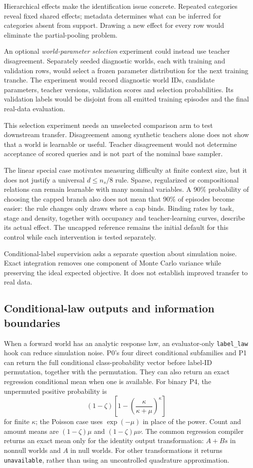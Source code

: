 \documentclass[11pt]{article}
\begin{document}
Hierarchical effects make the identification issue concrete. Repeated categories reveal fixed shared effects; metadata determines what can be inferred for categories absent from support. Drawing a new effect for every row would eliminate the partial-pooling problem.

An optional \emph{world-parameter selection} experiment could instead use teacher disagreement. Separately seeded diagnostic worlds, each with training and validation rows, would select a frozen parameter distribution for the next training tranche. The experiment would record diagnostic world IDs, candidate parameters, teacher versions, validation scores and selection probabilities. Its validation labels would be disjoint from all emitted training episodes and the final real-data evaluation.

This selection experiment needs an unselected comparison arm to test downstream transfer. Disagreement among synthetic teachers alone does not show that a world is learnable or useful. Teacher disagreement would not determine acceptance of scored queries and is not part of the nominal base sampler.

The linear special case motivates measuring difficulty at finite context size, but it does not justify a universal $d\leq n_s/8$ rule. Sparse, regularized or compositional relations can remain learnable with many nominal variables. A 90\% probability of choosing the capped branch also does not mean that 90\% of episodes become easier: the rule changes only draws where a cap binds. Binding rates by task, stage and density, together with occupancy and teacher-learning curves, describe its actual effect. The uncapped reference remains the initial default for this control while each intervention is tested separately.

Conditional-label supervision asks a separate question about simulation noise. Exact integration removes one component of Monte Carlo variance while preserving the ideal expected objective. It does not establish improved transfer to real data.

\subsection{Conditional-law outputs and information boundaries}

When a forward world has an analytic response law, an evaluator-only \texttt{label\_law} hook can reduce simulation noise. P0's four direct conditional subfamilies and P1 can return the full conditional class-probability vector before label-ID permutation, together with the permutation. They can also return an exact regression conditional mean when one is available. For binary P4, the unpermuted positive probability is
\[
(1-\zeta)\left[1-\left(\frac{\kappa}{\kappa+\mu}\right)^\kappa\right]
\]
for finite $\kappa$; the Poisson case uses $\exp(-\mu)$ in place of the power. Count and amount means are $(1-\zeta)\mu$ and $(1-\zeta)\mu\nu$. The common regression compiler returns an exact mean only for the identity output transformation: $A+B s$ in nonnull worlds and $A$ in null worlds. For other transformations it returns \texttt{unavailable}, rather than using an uncontrolled quadrature approximation.
\end{document}
